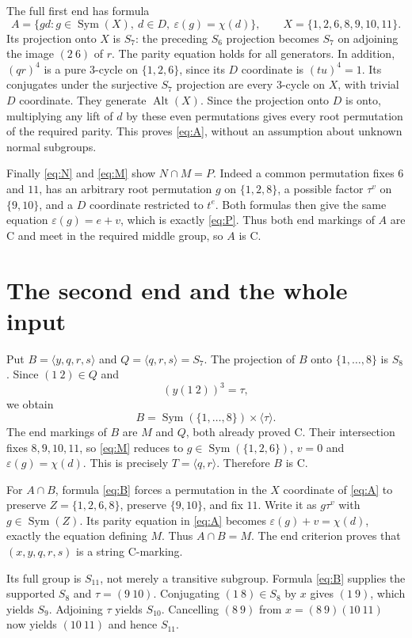 \documentclass[11pt,a4paper]{article}
\newcommand{\Sym}{\operatorname{Sym}}\newcommand{\Alt}{\operatorname{Alt}}
\newcommand{\gen}[1]{\langle#1\rangle}\newcommand{\eps}{\varepsilon}
\begin{document}
The full first end has formula
\begin{equation}\label{eq:A}
 A=\{g d:g\in\Sym(X),\ d\in D,\ \eps(g)=\chi(d)\},
 \qquad X=\{1,2,6,8,9,10,11\}.
\end{equation}
Its projection onto $X$ is $S_7$: the preceding $S_6$ projection becomes
$S_7$ on adjoining the image $(2\ 6)$ of $r$. The parity equation
holds for all generators. In addition, $(qr)^4$ is a pure $3$-cycle
on $\{1,2,6\}$, since its $D$ coordinate is $(tu)^4=1$.
Its conjugates under the surjective $S_7$ projection are every $3$-cycle
on $X$, with trivial $D$ coordinate. They generate $\Alt(X)$.
Since the projection onto $D$ is onto, multiplying any lift of $d$ by
these even permutations gives every root permutation of the required
parity. This proves \eqref{eq:A}, without an assumption about unknown
normal subgroups.

Finally \eqref{eq:N} and \eqref{eq:M} show $N\cap M=P$.
Indeed a common permutation fixes $6$ and $11$, has an arbitrary root
permutation $g$ on $\{1,2,8\}$, a possible factor $\tau^v$ on
$\{9,10\}$, and a $D$ coordinate restricted to $t^e$.
Both formulas then give the same equation $\eps(g)=e+v$,
which is exactly \eqref{eq:P}. Thus both end markings of $A$ are C
and meet in the required middle group, so $A$ is C.

\section{The second end and the whole input}
Put $B=\gen{y,q,r,s}$ and $Q=\gen{q,r,s}=S_7$.
The projection of $B$ onto $\{1,\ldots,8\}$ is $S_8$.
Since $(1\ 2)\in Q$ and
\[
 (y(1\ 2))^3=\tau,
\]
we obtain
\begin{equation}\label{eq:B}
 B=\Sym(\{1,\ldots,8\})\times\gen{\tau}.
\end{equation}
The end markings of $B$ are $M$ and $Q$, both already proved C.
Their intersection fixes $8,9,10,11$, so \eqref{eq:M} reduces to
$g\in\Sym(\{1,2,6\})$, $v=0$ and $\eps(g)=\chi(d)$.
This is precisely $T=\gen{q,r}$. Therefore $B$ is C.

For $A\cap B$, formula \eqref{eq:B} forces a permutation in the
$X$ coordinate of \eqref{eq:A} to preserve $Z=\{1,2,6,8\}$,
preserve $\{9,10\}$, and fix $11$. Write it as $g\tau^v$ with
$g\in\Sym(Z)$. Its parity equation in \eqref{eq:A} becomes
$\eps(g)+v=\chi(d)$, exactly the equation defining $M$.
Thus $A\cap B=M$. The end criterion proves that
$(x,y,q,r,s)$ is a string C-marking.

Its full group is $S_{11}$, not merely a transitive subgroup.
Formula \eqref{eq:B} supplies the supported $S_8$ and $\tau=(9\ 10)$.
Conjugating $(1\ 8)\in S_8$ by $x$ gives $(1\ 9)$, which yields
$S_9$. Adjoining $\tau$ yields $S_{10}$. Cancelling $(8\ 9)$ from
$x=(8\ 9)(10\ 11)$ now yields $(10\ 11)$ and hence $S_{11}$.
\end{document}
